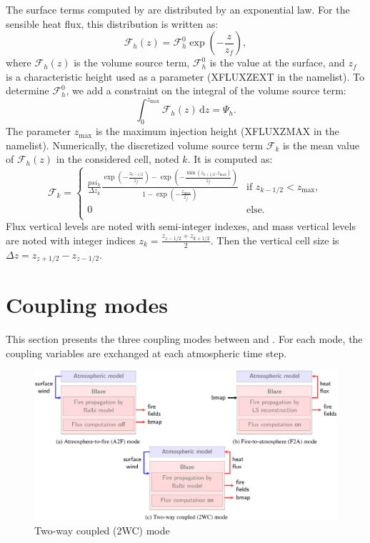 The surface terms computed by \Blaze{} are distributed by an exponential law. For the sensible heat flux, this distribution is written as:
\begin{equation}
  \mathcal F_h (z) = \mathcal F_h^0 \exp \left ( - \frac{z}{z_f} \right ),
\end{equation}
where $\mathcal F_h (z)$ is the volume source term, $\mathcal F_h^0$ is the value at the surface, and $z_f$ is a characteristic height used as a parameter (XFLUXZEXT in the namelist). To determine $\mathcal F_h^0$, we add a constraint on the integral of the volume source term:
\begin{equation}
  \int_0^{z_{\mathrm{max}}} \mathcal F_h (z) \, \mathrm d z = \Psi_h.
\end{equation}
The parameter $z_{\mathrm{max}}$ is the maximum injection height (XFLUXZMAX in the namelist). Numerically, the discretized volume source term $\mathcal F_k$ is the mean value of $\mathcal F_h (z)$ in the considered cell, noted $k$. It is computed as:
\begin{equation}
\mathcal F_k =
\begin{cases}
\frac{psi_h}{\Delta z_k} \frac{\exp \left ( - \frac{z_{k-1/2}}{z_f} \right ) - \exp \left ( - \frac{\min \left ( z_{k+1/2},z_{\mathrm{max}} \right )}{z_f} \right )}{1 - \exp \left ( -\frac{z_{\mathrm{max}}}{z_f}\right )}  & \text{if } z_{k-1/2} < z_{\mathrm{max}}, \\
0 & \text{else}. \\
\end{cases}
\end{equation}
Flux vertical levels are noted with semi-integer indexes, and mass vertical levels are noted with integer indices $z_k = \frac{z_{z - 1/2} + z_{k+1/2}}{2}$. Then the vertical cell size is $\Delta z = z_{z + 1/2} - z_{z - 1/2}$.



\section{Coupling modes}

This section presents the three coupling modes between \Blaze{} and \MNH.
For each mode, the coupling variables are exchanged at each atmospheric time step.

\begin{figure}
	\centering
	\includegraphics[width=\textwidth]{EPS/couplingmodes.png}
	\caption{Two-way coupled (2WC) mode}
  	\label{fig:2WCMode}
\end{figure}

